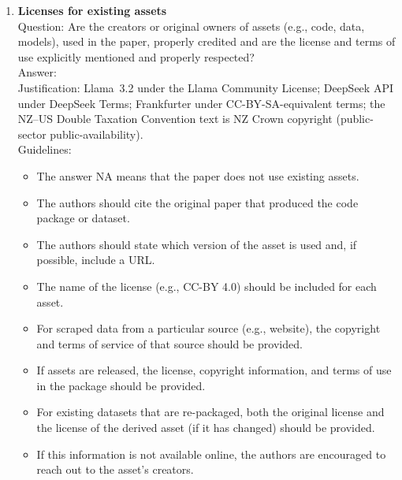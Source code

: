 \documentclass{article}
\begin{document}
\begin{enumerate}
\item {\bf Licenses for existing assets}\\
Question: Are the creators or original owners of assets (e.g., code, data, models), used in the paper, properly credited and are the license and terms of use explicitly mentioned and properly respected?\\
Answer: \answerYes{}\\
Justification: Llama~3.2 under the Llama Community License; DeepSeek API under DeepSeek Terms; Frankfurter under CC-BY-SA-equivalent terms; the NZ--US Double Taxation Convention text is NZ Crown copyright (public-sector public-availability).\\
Guidelines:
\begin{itemize}
\item The answer NA means that the paper does not use existing assets.
\item The authors should cite the original paper that produced the code package or dataset.
\item The authors should state which version of the asset is used and, if possible, include a URL.
\item The name of the license (e.g., CC-BY 4.0) should be included for each asset.
\item For scraped data from a particular source (e.g., website), the copyright and terms of service of that source should be provided.
\item If assets are released, the license, copyright information, and terms of use in the package should be provided.
\item For existing datasets that are re-packaged, both the original license and the license of the derived asset (if it has changed) should be provided.
\item If this information is not available online, the authors are encouraged to reach out to the asset's creators.
\end{itemize}


\end{enumerate}
\end{document}
